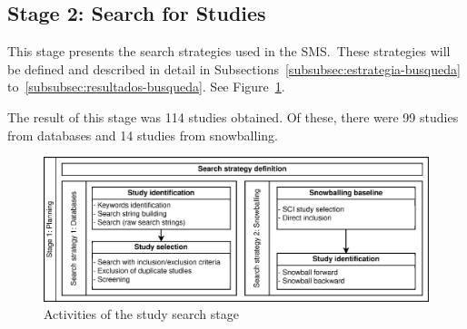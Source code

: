 \newcommand{\totalStudies}{114}
\newcommand{\databaseStudies}{99}
\newcommand{\snowballStudies}{14}
\newcommand{\directInclusionStudies}{0}



\subsection{Stage 2: Search for Studies}

This stage presents the search strategies used in the SMS.~These strategies will be defined and described in detail in Subsections~\ref{subsubsec:estrategia-busqueda} to~\ref{subsubsec:resultados-busqueda}. See Figure~\ref{fig:busqueda-estudios}.

The result of this stage was \totalStudies{} studies obtained. Of these, there were \databaseStudies{} studies from databases and \snowballStudies{} studies from snowballing.


\begin{figure}
	\centering
	\includegraphics[scale=0.8]{resources/figures/sms-Etapa-1-wide.eps}
	\caption{Activities of the study search stage}
	\label{fig:busqueda-estudios}
\end{figure}













